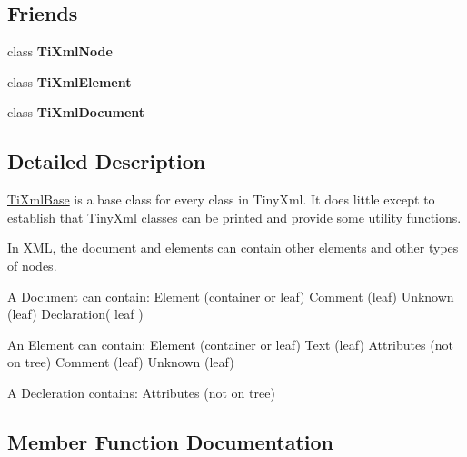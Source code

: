 \subsection*{Friends}
\begin{DoxyCompactItemize}
\item 
class {\bfseries Ti\+Xml\+Node}\hypertarget{classTiXmlBase_a218872a0d985ae30e78c55adc4bdb196}{}\label{classTiXmlBase_a218872a0d985ae30e78c55adc4bdb196}

\item 
class {\bfseries Ti\+Xml\+Element}\hypertarget{classTiXmlBase_ab6592e32cb9132be517cc12a70564c4b}{}\label{classTiXmlBase_ab6592e32cb9132be517cc12a70564c4b}

\item 
class {\bfseries Ti\+Xml\+Document}\hypertarget{classTiXmlBase_a173617f6dfe902cf484ce5552b950475}{}\label{classTiXmlBase_a173617f6dfe902cf484ce5552b950475}

\end{DoxyCompactItemize}


\subsection{Detailed Description}
\hyperlink{classTiXmlBase}{Ti\+Xml\+Base} is a base class for every class in Tiny\+Xml. It does little except to establish that Tiny\+Xml classes can be printed and provide some utility functions.

In X\+ML, the document and elements can contain other elements and other types of nodes.

\begin{DoxyVerb}A Document can contain: Element (container or leaf)
                        Comment (leaf)
                        Unknown (leaf)
                        Declaration( leaf )

An Element can contain: Element (container or leaf)
                        Text    (leaf)
                        Attributes (not on tree)
                        Comment (leaf)
                        Unknown (leaf)

A Decleration contains: Attributes (not on tree)
\end{DoxyVerb}
 

\subsection{Member Function Documentation}
